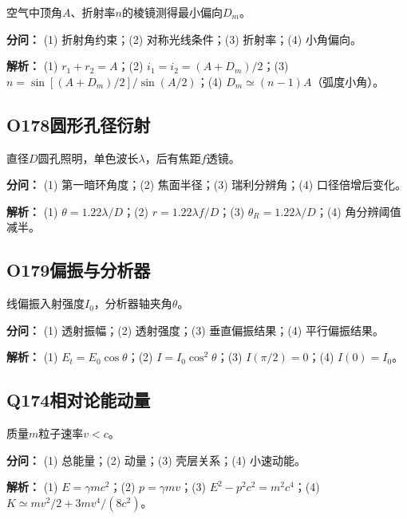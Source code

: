 空气中顶角$A$、折射率$n$的棱镜测得最小偏向$D_m$。

\par\textbf{分问：} (1) 折射角约束；(2) 对称光线条件；(3) 折射率；(4) 小角偏向。

\par\textbf{解析：} (1) $r_1+r_2=A$；(2) $i_1=i_2=(A+D_m)/2$；(3) $n=\sin[(A+D_m)/2]/\sin(A/2)$；(4) $D_m\simeq(n-1)A$（弧度小角）。

\medskip

\subsection*{O178\quad 圆形孔径衍射}

直径$D$圆孔照明，单色波长$\lambda$，后有焦距$f$透镜。

\par\textbf{分问：} (1) 第一暗环角度；(2) 焦面半径；(3) 瑞利分辨角；(4) 口径倍增后变化。

\par\textbf{解析：} (1) $\theta=1.22\lambda/D$；(2) $r=1.22\lambda f/D$；(3) $\theta_R=1.22\lambda/D$；(4) 角分辨阈值减半。

\medskip

\subsection*{O179\quad 偏振与分析器}

线偏振入射强度$I_0$，分析器轴夹角$\theta$。

\par\textbf{分问：} (1) 透射振幅；(2) 透射强度；(3) 垂直偏振结果；(4) 平行偏振结果。

\par\textbf{解析：} (1) $E_t=E_0\cos\theta$；(2) $I=I_0\cos^2\theta$；(3) $I(\pi/2)=0$；(4) $I(0)=I_0$。

\medskip

\subsection*{Q174\quad 相对论能动量}

质量$m$粒子速率$v<c$。

\par\textbf{分问：} (1) 总能量；(2) 动量；(3) 壳层关系；(4) 小速动能。

\par\textbf{解析：} (1) $E=\gamma mc^2$；(2) $p=\gamma mv$；(3) $E^2-p^2c^2=m^2c^4$；(4) $K\simeq mv^2/2+3mv^4/(8c^2)$。

